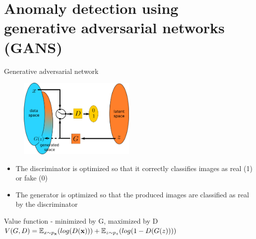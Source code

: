 \documentclass[xcolor=pdftex,dvipsnames,table,mathserif]{beamer}
\begin{document}
\section{Anomaly detection using generative adversarial networks (GANS)}

\begin{frame}{Generative adversarial network~\tiny{\cite{goodfellow_generative_2014}}}

  \begin{figure}[ht]
    \centering
    \includegraphics[width=0.5\textwidth]{gan2}
  \end{figure}

  \begin{itemize}
  \item The discriminator is optimized so that it correctly classifies images as real (1) or fake (0)
  \item The generator is optimized so that the produced images are classified as real by the discriminator
  \end{itemize}

  \begin{block}{Value function - minimized by G, maximized by D}
    $V(G,D) = \mathbb{E}_{x \sim p_{\mathbf{x}}}(log(D(\mathbf{x}))) + \mathbb{E}_{z \sim p_z}(log(1 - D(G(z))))$
  \end{block}

\end{frame}




\end{document}
